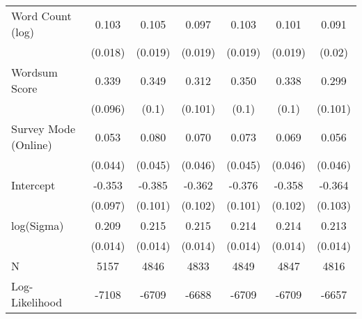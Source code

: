 \begin{table}[ht]
\begin{tabular}{lcccccc}
  Word Count (log) &  0.103 &  0.105 &  0.097 &  0.103 &  0.101 &  0.091 \\ 
   & (0.018) & (0.019) & (0.019) & (0.019) & (0.019) & (0.02) \\ 
  Wordsum Score &  0.339 &  0.349 &  0.312 &  0.350 &  0.338 &  0.299 \\ 
   & (0.096) & (0.1) & (0.101) & (0.1) & (0.1) & (0.101) \\ 
  Survey Mode (Online) &  0.053 &  0.080 &  0.070 &  0.073 &  0.069 &  0.056 \\ 
   & (0.044) & (0.045) & (0.046) & (0.045) & (0.046) & (0.046) \\ 
  Intercept & -0.353 & -0.385 & -0.362 & -0.376 & -0.358 & -0.364 \\ 
   & (0.097) & (0.101) & (0.102) & (0.101) & (0.102) & (0.103) \\ 
  log(Sigma) &  0.209 &  0.215 &  0.215 &  0.214 &  0.214 &  0.213 \\ 
   & (0.014) & (0.014) & (0.014) & (0.014) & (0.014) & (0.014) \\ 
   \hline
N & 5157 & 4846 & 4833 & 4849 & 4847 & 4816 \\ 
  Log-Likelihood & -7108 & -6709 & -6688 & -6709 & -6709 & -6657 \\ 
   \hline
\end{tabular}
\endgroup
\end{table}
